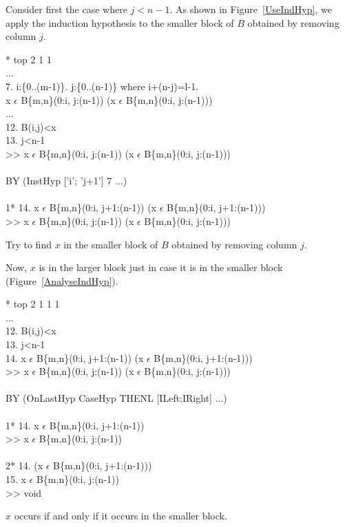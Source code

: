 Consider first the case where $j<n-1$.  As shown in Figure~\ref{UseIndHyp}, we
apply the induction hypothesis to the smaller block of $B$ obtained by removing
column $j$.
\begin{RuledFigure}
\begin{Screen}{1}{\SnapshotSize}
\N{}* top 2 1 1 \\{}
\N{}... \\{}
\N{}7. \mforall{}i:\{0..(m-1)\}. \mforall{}j:\{0..(n-1)\} where i+(n-j)=l-1.  \\{}
\N{}      x \(\epsilon{}\) B\{m,n\}(0:i, j:(n-1)) \mvee{}  \mneg{}(x \(\epsilon{}\) B\{m,n\}(0:i, j:(n-1))) \\{}
\N{}... \\{}
\N{}12. B(i,j)<x \\{}
\N{}13. j<n-1 \\{}
\N{}>> x \(\epsilon{}\) B\{m,n\}(0:i, j:(n-1))  \mvee{}  \mneg{}(x \(\epsilon{}\) B\{m,n\}(0:i, j:(n-1))) \\{}
\N{} \\{}
\N{}BY (InstHyp ['i'; 'j+1'] 7 ...) \\{}
\N{}    \\{}
\N{}1* 14. x \(\epsilon{}\) B\{m,n\}(0:i, j+1:(n-1)) \mvee{}  \mneg{}(x \(\epsilon{}\) B\{m,n\}(0:i, j+1:(n-1))) \\{}
\N{}   >> x \(\epsilon{}\) B\{m,n\}(0:i, j:(n-1))  \mvee{}  \mneg{}(x \(\epsilon{}\) B\{m,n\}(0:i, j:(n-1)))    
\end{Screen}%
\caption{Try to find $x$ in the smaller block of $B$ obtained by removing column $j$.}
\label{UseIndHyp} 
\end{RuledFigure}%
Now, $x$ is in the larger block just in case it is in the smaller block
(Figure~\ref{AnalyseIndHyp}).
\begin{RuledFigure}
\begin{Screen}{1}{\SnapshotSize}
\N{}* top 2 1 1 1 \\{}
\N{}... \\{}
\N{}12. B(i,j)<x \\{}
\N{}13. j<n-1 \\{}
\N{}14. x \(\epsilon{}\) B\{m,n\}(0:i, j+1:(n-1)) \mvee{}  \mneg{}(x \(\epsilon{}\) B\{m,n\}(0:i, j+1:(n-1))) \\{}
\N{}>> x \(\epsilon{}\) B\{m,n\}(0:i, j:(n-1))  \mvee{}  \mneg{}(x \(\epsilon{}\) B\{m,n\}(0:i, j:(n-1))) \\{}
\N{} \\{}
\N{}BY (OnLastHyp CaseHyp THENL [ILeft;IRight] ...) \\{}
\N{}    \\{}
\N{}1* 14. x \(\epsilon{}\) B\{m,n\}(0:i, j+1:(n-1)) \\{}
\N{}   >> x \(\epsilon{}\) B\{m,n\}(0:i, j:(n-1)) \\{}
\N{} \\{}
\N{}2* 14. \mneg{}(x \(\epsilon{}\) B\{m,n\}(0:i, j+1:(n-1))) \\{}
\N{}   15. x \(\epsilon{}\) B\{m,n\}(0:i, j:(n-1)) \\{}
\N{}   >> void    
\end{Screen}%
\caption{$x$ occurs if and only if it occurs in the smaller block.}
\label{AnalyseIndHyp} 
\end{RuledFigure}%
